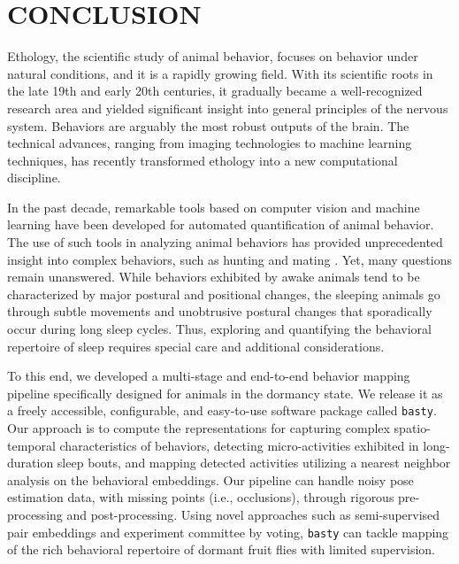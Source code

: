 \setlength{\parindent}{0pt}
\chapter{\bf CONCLUSION}\label{chapter:conclusion}

Ethology, the scientific study of animal behavior, focuses on behavior under natural conditions, and it is a rapidly growing field. With its scientific roots in the late 19th and early 20th centuries, it gradually became a well-recognized research area and yielded significant insight into general principles of the nervous system.
Behaviors are arguably the most robust outputs of the brain. The technical advances, ranging from imaging technologies to machine learning techniques, has recently transformed ethology into a new computational discipline.

In the past decade, remarkable tools based on computer vision and machine learning have been developed for automated quantification of animal behavior.
The use of such tools in analyzing animal behaviors has provided unprecedented insight into complex behaviors, such as hunting and mating \citep{mearns_deconstructing_2020, janisch_deciphering_2021}.
Yet, many questions remain unanswered.
While behaviors exhibited by awake animals tend to be characterized by major postural and positional changes, the sleeping animals go through subtle movements and unobtrusive postural changes that sporadically  occur during long sleep cycles.
Thus, exploring and quantifying the behavioral repertoire of sleep requires special care and additional considerations.

To this end, we developed a multi-stage and end-to-end behavior mapping pipeline specifically designed for animals in the dormancy state. We release it as a freely accessible, configurable, and easy-to-use software package called \texttt{basty}.
Our approach is to compute the representations for capturing complex spatio-temporal characteristics of behaviors, detecting micro-activities exhibited in long-duration sleep bouts, and mapping detected activities utilizing a nearest neighbor analysis on the behavioral embeddings.
Our pipeline can handle noisy pose estimation data, with missing points (i.e., occlusions), through rigorous pre-processing and post-processing.
Using novel approaches such as semi-supervised pair embeddings and experiment committee by voting, \texttt{basty} can tackle mapping of the rich behavioral repertoire of dormant fruit flies with limited supervision.


